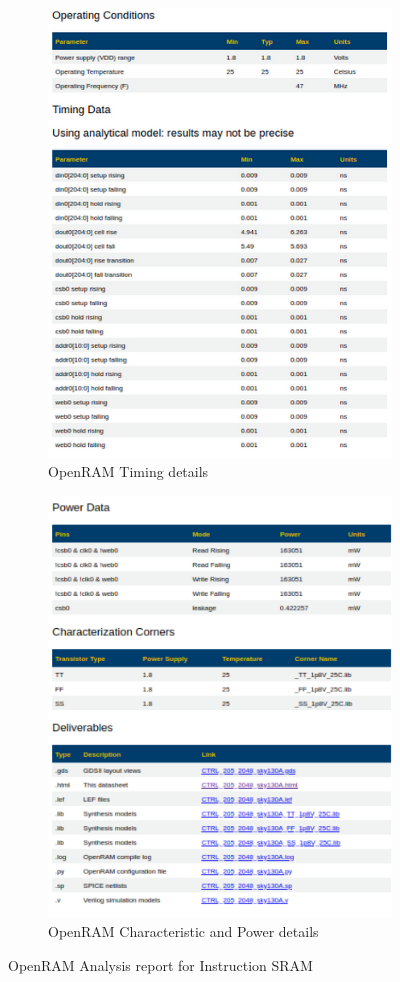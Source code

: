     \begin{figure}
      \begin{subfigure}{.5\textwidth}
        \centering
        \includegraphics[width=.8\linewidth]{./ASIC/OpenRAM_INST_timing.png}
        \caption{OpenRAM Timing details}
        \end{subfigure}%
        \begin{subfigure}{.5\textwidth}
        \centering
        \includegraphics[width=.8\linewidth]{./ASIC/OpenRAM_INST_power.png}
        \caption{OpenRAM Characteristic and Power details}
        \end{subfigure}
        \caption{OpenRAM Analysis report for Instruction SRAM}
\end{figure}
      
